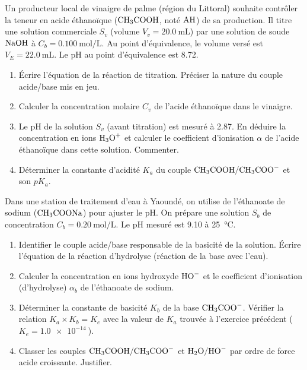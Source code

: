 \documentclass[11pt]{article}
\begin{document}
\begin{exercice}
\label{exo:acide_faible}
Un producteur local de vinaigre de palme (région du Littoral) souhaite contrôler la teneur en acide éthanoïque ($\ce{CH3COOH}$, noté $\ce{AH}$) de sa production. Il titre une solution commerciale $S_v$ (volume $V_v = \SI{20,0}{\milli\liter}$) par une solution de soude $\ce{NaOH}$ à $C_b = \SI{0,100}{\mole\per\liter}$. Au point d'équivalence, le volume versé est $V_{E} = \SI{22,0}{\milli\liter}$. Le pH au point d'équivalence est \num{8,72}.
\begin{enumerate}
    \item Écrire l'équation de la réaction de titration. Préciser la nature du couple acide/base mis en jeu.
    \item Calculer la concentration molaire $C_v$ de l'acide éthanoïque dans le vinaigre.
    \item Le pH de la solution $S_v$ (avant titration) est mesuré à \num{2,87}. En déduire la concentration en ions $\ce{H3O+}$ et calculer le coefficient d'ionisation $\alpha$ de l'acide éthanoïque dans cette solution. Commenter.
    \item Déterminer la constante d'acidité $K_a$ du couple $\ce{CH3COOH}/\ce{CH3COO-}$ et son $pK_a$.
\end{enumerate}
\end{exercice}

\begin{exercice}
\label{exo:base_faible}
Dans une station de traitement d'eau à Yaoundé, on utilise de l'éthanoate de sodium ($\ce{CH3COONa}$) pour ajuster le pH. On prépare une solution $S_b$ de concentration $C_b = \SI{0,20}{\mole\per\liter}$. Le pH mesuré est \num{9,10} à \SI{25}{\celsius}.
\begin{enumerate}
    \item Identifier le couple acide/base responsable de la basicité de la solution. Écrire l'équation de la réaction d'hydrolyse (réaction de la base avec l'eau).
    \item Calculer la concentration en ions hydroxyde $\ce{HO-}$ et le coefficient d'ionisation (d'hydrolyse) $\alpha_b$ de l'éthanoate de sodium.
    \item Déterminer la constante de basicité $K_b$ de la base $\ce{CH3COO-}$. Vérifier la relation $K_a \times K_b = K_e$ avec la valeur de $K_a$ trouvée à l'exercice précédent ($K_e = \SI{1,0e-14}{}$).
    \item Classer les couples $\ce{CH3COOH}/\ce{CH3COO-}$ et $\ce{H2O}/\ce{HO-}$ par ordre de force acide croissante. Justifier.
\end{enumerate}
\end{exercice}
\end{document}
